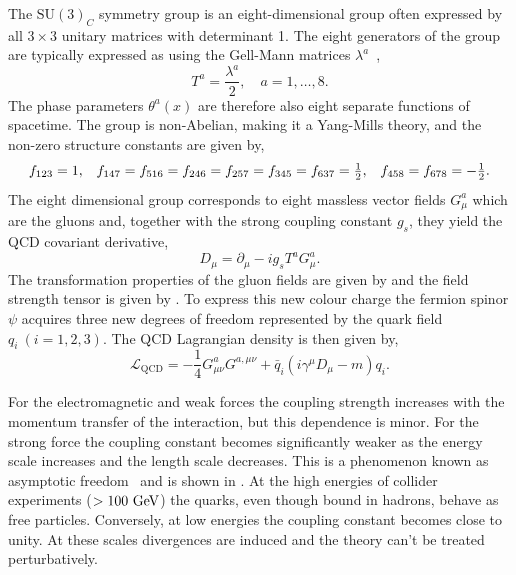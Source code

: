 The $\text{SU}(3)_C$ symmetry group is an eight-dimensional group often expressed by all $3 \times 3$ unitary matrices with determinant 1.
The eight generators of the group are typically expressed as using the Gell-Mann matrices $\lambda^a$~\cite{GellManMatrix},
\begin{equation}
	\label{eq:su3_generators}
	T^a = \frac{\lambda^a}{2}, \quad a = 1, \ldots, 8.
\end{equation}
The phase parameters $\theta^a(x)$ are therefore also eight separate functions of spacetime.
The group is non-Abelian, making it a Yang-Mills theory, and the non-zero structure constants are given by,
\begin{equation}
	\label{eq:qcd_sc}
	\begin{array}{ccc}
		f_{123} = 1 ,                                                            & \hspace{\stretch{1}}
		f_{147} = f_{516} = f_{246} = f_{257} = f_{345} = f_{637} = \frac{1}{2}, & \hspace{\stretch{1}}
		f_{458} = f_{678} = -\frac{1}{2}.
	\end{array}
\end{equation}
The eight dimensional group corresponds to eight massless vector fields $G_\mu^a$ which are the gluons and, together with the strong coupling constant $g_s$, they yield the QCD covariant derivative,
\begin{equation}
	\label{eq:qcd_covariant_derivative}
	D_\mu = \partial_\mu - i g_s T^a G_\mu^a.
\end{equation}
The transformation properties of the gluon fields are given by  and the field strength tensor is given by .
To express this new colour charge the fermion spinor $\psi$ acquires three new degrees of freedom represented by the quark field $q_i\:(i = 1, 2, 3)$.
The QCD Lagrangian density is then given by,
\begin{equation}
	\label{eq:qcd_lagrangian}
	\mathcal{L}_\text{QCD} = -\frac{1}{4} G_{\mu\nu}^a G^{a,\mu\nu} + \bar q_i (i \gamma^\mu D_\mu - m) q_i.
\end{equation}

For the electromagnetic and weak forces the coupling strength increases with the momentum transfer of the interaction, but this dependence is minor.
For the strong force the coupling constant becomes significantly weaker as the energy scale increases and the length scale decreases.
This is a phenomenon known as asymptotic freedom~\cite{PriceAsymptoticFreedom} and is shown in .
At the high energies of collider experiments ($ > 100~\GeV$) the quarks, even though bound in hadrons, behave as free particles.
Conversely, at low energies the coupling constant becomes close to unity.
At these scales divergences are induced and the theory can't be treated perturbatively.

